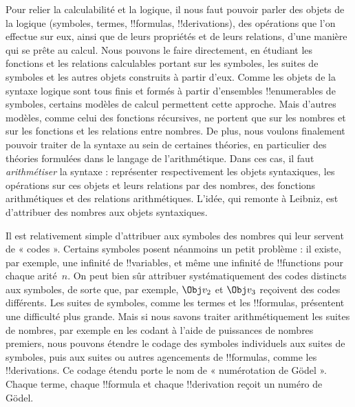\documentclass[../../../include/open-logic-section]{subfiles}
\begin{document}

Pour relier la calculabilité et la logique, il nous faut pouvoir
parler des objets de la logique (symboles, termes, !!{formula}s,
!!{derivation}s), des opérations que l'on effectue sur eux, ainsi
que de leurs propriétés et de leurs relations, d'une manière qui
se prête au calcul. Nous pouvons le faire directement, en étudiant
les fonctions et les relations calculables portant sur les symboles,
les suites de symboles et les autres objets construits à partir
d'eux. Comme les objets de la syntaxe logique sont tous finis et
formés à partir d'ensembles !!{enumerable}s de symboles, certains
modèles de calcul permettent cette approche. Mais d'autres modèles,
comme celui des fonctions récursives, ne portent que sur les nombres
et sur les fonctions et les relations entre nombres. De plus, nous
voulons finalement pouvoir traiter de la syntaxe au sein de
certaines théories, en particulier des théories formulées dans le
langage de l'arithmétique. Dans ces cas, il faut
\emph{arithmétiser} la syntaxe : représenter respectivement les
objets syntaxiques, les opérations sur ces objets et leurs
relations par des nombres, des fonctions arithmétiques et des
relations arithmétiques. L'idée, qui remonte à Leibniz, est
d'attribuer des nombres aux objets syntaxiques.

Il est relativement simple d'attribuer aux symboles des nombres qui
leur servent de « codes ». Certains symboles posent néanmoins un
petit problème : il existe, par exemple, une infinité de
!!{variable}s, et même une infinité de !!{function}s pour chaque
arité~$n$. On peut bien sûr attribuer systématiquement des codes
distincts aux symboles, de sorte que, par exemple, $\Obj v_2$ et
$\Obj v_3$ reçoivent des codes différents. Les suites de symboles,
comme les termes et les !!{formula}s, présentent une difficulté
plus grande. Mais si nous savons traiter arithmétiquement les suites
de nombres, par exemple en les codant à l'aide de puissances de
nombres premiers, nous pouvons étendre le codage des symboles
individuels aux suites de symboles, puis aux suites ou autres
agencements de !!{formula}s, comme les !!{derivation}s. Ce codage
étendu porte le nom de « numérotation de G\"odel ». Chaque terme,
chaque !!{formula} et chaque !!{derivation} reçoit un numéro de
G\"odel.
\end{document}
